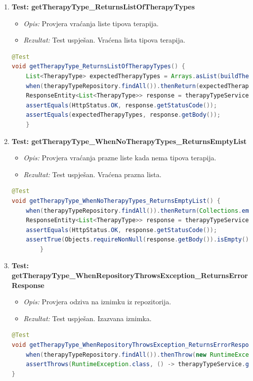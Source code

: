 			\begin{enumerate}
				\item \textbf{Test: getTherapyType\_ReturnsListOfTherapyTypes}
				\begin{itemize}
					\item \textit{Opis:} Provjera vraćanja liste tipova terapija.
					\item \textit{Rezultat:} Test uspješan. Vraćena lista tipova terapija.
				\end{itemize}
\begin{lstlisting}[language=Java]
@Test
void getTherapyType_ReturnsListOfTherapyTypes() {
	List<TherapyType> expectedTherapyTypes = Arrays.asList(buildTherapyType("1"), buildTherapyType("2"));
	when(therapyTypeRepository.findAll()).thenReturn(expectedTherapyTypes);
	ResponseEntity<List<TherapyType>> response = therapyTypeService.getTherapyType();
	assertEquals(HttpStatus.OK, response.getStatusCode());
	assertEquals(expectedTherapyTypes, response.getBody());
	}
\end{lstlisting}

				\item \textbf{Test: getTherapyType\_WhenNoTherapyTypes\_ReturnsEmptyList}
				\begin{itemize}
					\item \textit{Opis:} Provjera vraćanja prazne liste kada nema tipova terapija.
					\item \textit{Rezultat:} Test uspješan. Vraćena prazna lista.
				\end{itemize}
\begin{lstlisting}[language=Java]
@Test
void getTherapyType_WhenNoTherapyTypes_ReturnsEmptyList() {
	when(therapyTypeRepository.findAll()).thenReturn(Collections.emptyList());
	ResponseEntity<List<TherapyType>> response = therapyTypeService.getTherapyType();
	assertEquals(HttpStatus.OK, response.getStatusCode());
	assertTrue(Objects.requireNonNull(response.getBody()).isEmpty());
		}
\end{lstlisting}

				\item \textbf{Test: getTherapyType\_WhenRepositoryThrowsException\_ReturnsErrorResponse}
				\begin{itemize}
					\item \textit{Opis:} Provjera odziva na iznimku iz repozitorija.
					\item \textit{Rezultat:} Test uspješan. Izazvana iznimka.
				\end{itemize}

\begin{lstlisting}[language=Java]
@Test
void getTherapyType_WhenRepositoryThrowsException_ReturnsErrorResponse() {
	when(therapyTypeRepository.findAll()).thenThrow(new RuntimeException("Database error"));
	assertThrows(RuntimeException.class, () -> therapyTypeService.getTherapyType());
}
\end{lstlisting}
			\end{enumerate}
			
